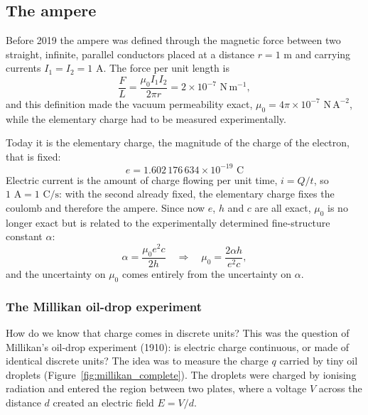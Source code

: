 \documentclass[letterpaper,11pt,leqno]{book}
\begin{document}
\subsection{The ampere}

Before 2019 the ampere was defined through the magnetic force between two straight, infinite, parallel conductors placed at a distance $r = 1\text{ m}$ and carrying currents $I_1 = I_2 = 1\text{ A}$. The force per unit length is
\begin{equation}
\frac{F}{L} = \frac{\mu_0 I_1 I_2}{2\pi r} = 2 \times 10^{-7}\text{ N}\,\text{m}^{-1},
\label{eq:ampere_historical}
\end{equation}
and this definition made the vacuum permeability exact, $\mu_0 = 4\pi \times 10^{-7}\text{ N}\,\text{A}^{-2}$, while the elementary charge had to be measured experimentally.

Today it is the elementary charge, the magnitude of the charge of the electron, that is fixed:
\begin{equation}
\boxed{e = 1.602\,176\,634 \times 10^{-19}\text{ C}}
\label{eq:elementary_charge_def}
\end{equation}
Electric current is the amount of charge flowing per unit time, $i = Q/t$, so $1\text{ A} = 1\text{ C/s}$: with the second already fixed, the elementary charge fixes the coulomb and therefore the ampere. Since now $e$, $h$ and $c$ are all exact, $\mu_0$ is no longer exact but is related to the experimentally determined fine-structure constant $\alpha$:
\begin{equation}
\alpha = \frac{\mu_0 e^2 c}{2h} \quad \Longrightarrow \quad \mu_0 = \frac{2\alpha h}{e^2 c},
\label{eq:mu0_derivation}
\end{equation}
and the uncertainty on $\mu_0$ comes entirely from the uncertainty on $\alpha$.

\subsubsection*{The Millikan oil-drop experiment}

How do we know that charge comes in discrete units? This was the question of Millikan's oil-drop experiment (1910): is electric charge continuous, or made of identical discrete units? The idea was to measure the charge $q$ carried by tiny oil droplets (Figure~\ref{fig:millikan_complete}). The droplets were charged by ionising radiation and entered the region between two plates, where a voltage $V$ across the distance $d$ created an electric field $E = V/d$.
\end{document}

